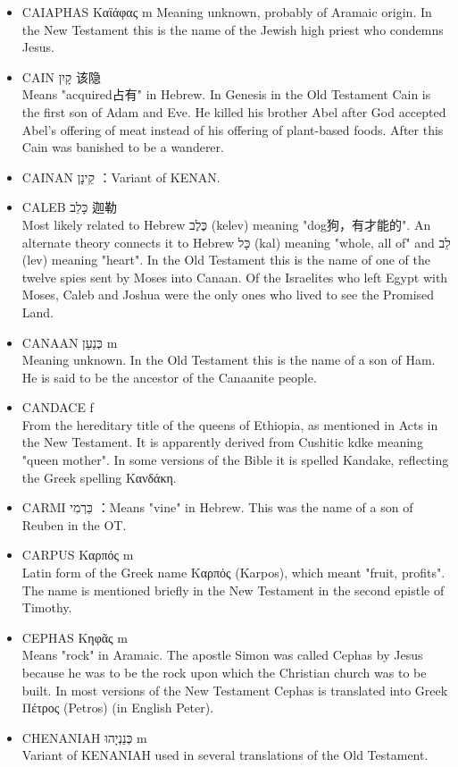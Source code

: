 \begin{itemize} 
\itemsep-.25em 
\item {CAIAPHAS Καϊάφας m}
Meaning unknown, probably of Aramaic origin. In the New Testament this is the name of the Jewish high priest who condemns Jesus.

\item {CAIN קָיִן 该隐}\\
Means "acquired占有" in Hebrew. In Genesis in the Old Testament Cain is the first son of Adam and Eve. He killed his brother Abel after God accepted Abel's offering of meat instead of his offering of plant-based foods. After this Cain was banished to be a wanderer.

\item CAINAN קֵינָן ：Variant of KENAN.

\item {CALEB כָּלֵב 迦勒}\\
Most likely related to Hebrew כֶּלֶב (kelev) meaning "dog狗，有才能的". An alternate theory connects it to Hebrew כָּל (kal) meaning "whole, all of" and לֵב (lev) meaning "heart". In the Old Testament this is the name of one of the twelve spies sent by Moses into Canaan. Of the Israelites who left Egypt with Moses, Caleb and Joshua were the only ones who lived to see the Promised Land.
\item {CANAAN כְּנַעַן m}\\
Meaning unknown. In the Old Testament this is the name of a son of Ham. He is said to be the ancestor of the Canaanite people.
\item {CANDACE f}\\
From the hereditary title of the queens of Ethiopia, as mentioned in Acts in the New Testament. It is apparently derived from Cushitic kdke meaning "queen mother". In some versions of the Bible it is spelled Kandake, reflecting the Greek spelling Κανδάκη. 
\item CARMI כַּרְמִי ：Means "vine" in Hebrew. This was the name of a son of Reuben in the OT.
\item {CARPUS Καρπός m}\\
Latin form of the Greek name Καρπός (Karpos), which meant "fruit, profits". The name is mentioned briefly in the New Testament in the second epistle of Timothy.
\item {CEPHAS Κηφᾶς m}\\
Means "rock" in Aramaic. The apostle Simon was called Cephas by Jesus because he was to be the rock upon which the Christian church was to be built. In most versions of the New Testament Cephas is translated into Greek Πέτρος (Petros) (in English Peter).
\item {CHENANIAH כְּנַנְיָהוּ m}\\
Variant of KENANIAH used in several translations of the Old Testament.


\end{itemize}
